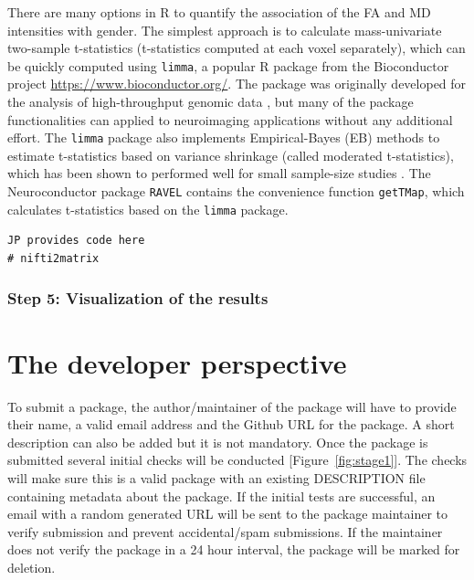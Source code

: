 \documentclass[]{elsarticle} %
\begin{document}
There are many options in R to quantify the association of the FA and MD intensities with gender. The simplest approach is to calculate mass-univariate two-sample t-statistics (t-statistics computed at each voxel separately), which can be quickly computed using \texttt{limma}, a popular R package from the Bioconductor project \url{https://www.bioconductor.org/}. The package was originally developed for the analysis of high-throughput genomic data \citep{ritchie2015limma}, but many of the package functionalities can  applied to neuroimaging applications without any additional effort. The \texttt{limma} package also implements Empirical-Bayes (EB) methods to estimate  t-statistics based on variance shrinkage (called moderated t-statistics), which has been shown to performed well for small sample-size studies \citep{berkeley2004linear,ritchie2015limma}. The Neuroconductor package \texttt{RAVEL} contains the convenience function \texttt{getTMap}, which calculates t-statistics based on the \texttt{limma} package. 

\color{blue}
\begin{verbatim}
JP provides code here
# nifti2matrix
\end{verbatim}
\color{black}

\subsubsection{Step 5: Visualization of the results}


\section{The developer perspective}\label{section:dev_perspective}
To submit a package, the author/maintainer of the package will have to provide their name, a valid email address and the Github URL for the package. A short description can also be added but it is not mandatory. Once the package is submitted several initial checks will be conducted [Figure~\ref{fig:stage1}]. The checks will make sure this is a valid package with an existing DESCRIPTION file containing metadata about the package. If the initial tests are successful, an email with a random generated URL will be sent to the package maintainer to verify submission and prevent accidental/spam submissions. If the maintainer does not verify the package in a 24 hour interval, the package will be marked for deletion. 
\end{document}
